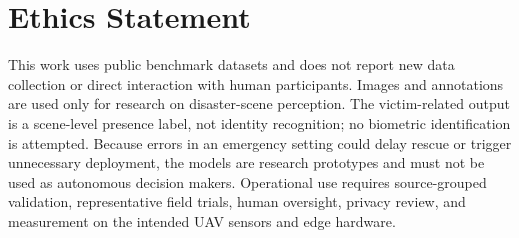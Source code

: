 \section*{Ethics Statement}

This work uses public benchmark datasets and does not report new data collection or direct interaction with human participants. Images and annotations are used only for research on disaster-scene perception. The victim-related output is a scene-level presence label, not identity recognition; no biometric identification is attempted. Because errors in an emergency setting could delay rescue or trigger unnecessary deployment, the models are research prototypes and must not be used as autonomous decision makers. Operational use requires source-grouped validation, representative field trials, human oversight, privacy review, and measurement on the intended UAV sensors and edge hardware.
\pagebreak
